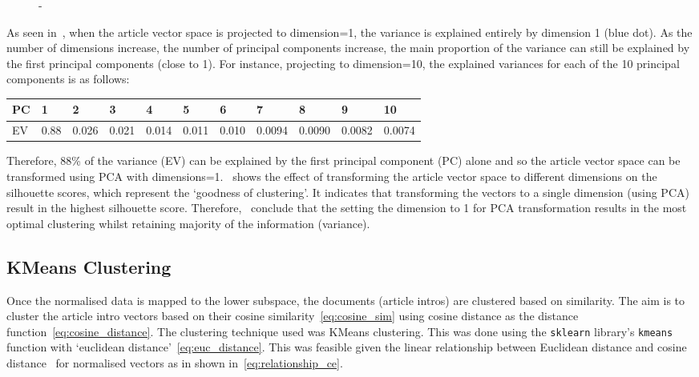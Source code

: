 \begin{figure}[H]
\begin{minipage}[t]{.49\textwidth}
      \caption{-}
      \label{fig:pca_sil}
    \end{minipage}
  \end{figure}

  As seen in~, when the article vector space is projected to dimension=1, the variance is explained entirely by dimension 1 (blue dot). As the number of dimensions increase, the number of principal components increase, the main proportion of the variance can still be explained by the first principal components (close to 1). For instance, projecting to dimension=10, the explained variances for each of the 10 principal components is as follows: 
  \begin{table}[H]
      \centering
  \renewcommand{\arraystretch}{1.1}
  \begin{tabularx}{\textwidth}{|X|X X X X X X X X X X|} 
    \hline
    PC & \textbf{1} & \textbf{2}  & \textbf{3}  & \textbf{4}  & \textbf{5} & \textbf{6} & \textbf{7}  & \textbf{8}  & \textbf{9}  & \textbf{10}\\
    \hline
    EV & 0.88 & 0.026 & 0.021 & 0.014 & 0.011 & 0.010 & 0.0094 & 0.0090 & 0.0082 & 0.0074\\ 
    \hline
    \end{tabularx}
  \end{table}
  
  Therefore, 88\% of the variance (EV) can be explained by the first principal component (PC) alone and so the article vector space can be transformed using PCA with dimensions=1.~ shows the effect of transforming the article vector space to different dimensions on the silhouette scores, which represent the `goodness of clustering'. It indicates that transforming the vectors to a single dimension (using PCA) result in the highest silhouette score. Therefore,~ conclude that the setting the dimension to 1 for PCA transformation results in the most optimal clustering whilst retaining majority of the information (variance).

\subsection{KMeans Clustering}
Once the normalised data is mapped to the lower subspace, the documents (article intros) are clustered based on similarity. The aim is to cluster the article intro vectors based on their cosine similarity~\cref{eq:cosine_sim} using cosine distance as the distance function~\cref{eq:cosine_distance}. The clustering technique used was KMeans clustering. This was done using the \texttt{sklearn} library's \texttt{kmeans} function with `euclidean distance'~\cref{eq:euc_distance}. This was feasible given the linear relationship between Euclidean distance and  cosine distance~\cite{kmeans} for normalised vectors as in shown in~\cref{eq:relationship_ce}.


